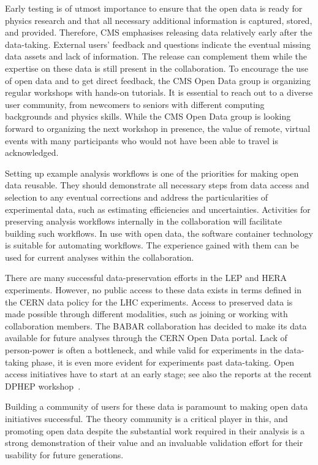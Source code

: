 \documentclass[11pt]{article}
\begin{document}
Early testing is of utmost importance to ensure that the open data is ready for physics research and that all necessary additional information is captured, stored, and provided. Therefore, \gls{CMS} emphasises releasing data relatively early after the data-taking. External users' feedback and questions indicate the eventual missing data assets and lack of information. The release can complement them while the expertise on these data is still present in the collaboration. To encourage the use of open data and to get direct feedback, the \gls{CMS} Open Data group is organizing regular workshops with hands-on tutorials. It is essential to reach out to a diverse user community, from newcomers to seniors with different computing backgrounds and physics skills. While the \gls{CMS} Open Data group is looking forward to organizing the next workshop in presence, the value of remote, virtual events with many participants who would not have been able to travel is acknowledged.

Setting up example analysis workflows is one of the priorities for making open data reusable. They should demonstrate all necessary steps from data access and selection to any eventual corrections and address the particularities of experimental data, such as estimating efficiencies and uncertainties. Activities for preserving analysis workflows internally in the collaboration will facilitate building such workflows. In use with open data, the software container technology is suitable for automating workflows. The experience gained with them can be used for current analyses within the collaboration.


There are many successful data-preservation efforts in the \gls{LEP} and \gls{HERA} experiments. However, no public access to these data exists in terms defined in the \gls{CERN} data policy for the \gls{LHC} experiments. Access to preserved data is made possible through different modalities, such as joining or working with collaboration members. The \gls{BABAR} collaboration has decided to make its data available for future analyses through the \gls{CERN} Open Data portal. Lack of person-power is often a bottleneck, and while valid for experiments in the data-taking phase, it is even more evident for experiments past data-taking. Open access initiatives have to start at an early stage; see also the reports at the recent DPHEP workshop~\cite{DPHEPws:2021}.

Building a community of users for these data is paramount to making open data initiatives successful. The theory community is a critical player in this, and promoting open data despite the substantial work required in their analysis is a strong demonstration of their value and an invaluable validation effort for their usability for future generations.
\end{document}
